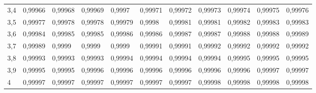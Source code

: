 \documentclass[spanish, 11pt]{exam}
\begin{document}
\begin{center}
\begin{tabular}{l|llllllllll}
3,4 & 0,99966 & 0,99968 & 0,99969 & 0,9997  & 0,99971 & 0,99972 & 0,99973 & 0,99974 & 0,99975 & 0,99976 \\
3,5 & 0,99977 & 0,99978 & 0,99978 & 0,99979 & 0,9998  & 0,99981 & 0,99981 & 0,99982 & 0,99983 & 0,99983 \\
3,6 & 0,99984 & 0,99985 & 0,99985 & 0,99986 & 0,99986 & 0,99987 & 0,99987 & 0,99988 & 0,99988 & 0,99989 \\
3,7 & 0,99989 & 0,9999  & 0,9999  & 0,9999  & 0,99991 & 0,99991 & 0,99992 & 0,99992 & 0,99992 & 0,99992 \\
3,8 & 0,99993 & 0,99993 & 0,99993 & 0,99994 & 0,99994 & 0,99994 & 0,99994 & 0,99995 & 0,99995 & 0,99995 \\
3,9 & 0,99995 & 0,99995 & 0,99996 & 0,99996 & 0,99996 & 0,99996 & 0,99996 & 0,99996 & 0,99997 & 0,99997 \\
4   & 0,99997 & 0,99997 & 0,99997 & 0,99997 & 0,99997 & 0,99997 & 0,99998 & 0,99998 & 0,99998 & 0,99998
\end{tabular}

        \end{center}

    
\end{document}
